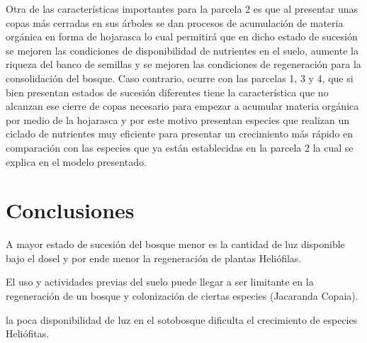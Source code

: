 \documentclass[letterpaper,9pt,onecolumn,twoside,]{pinp}
\begin{document}
Otra de las características importantes para la parcela 2 es que al
presentar unas copas más cerradas en sus árboles se dan procesos de
acumulación de materia orgánica en forma de hojarasca lo cual permitirá
que en dicho estado de sucesión se mejoren las condiciones de
disponibilidad de nutrientes en el suelo, aumente la riqueza del banco
de semillas y se mejoren las condiciones de regeneración para la
consolidación del bosque. Caso contrario, ocurre con las parcelas 1, 3 y
4, que si bien presentan estados de sucesión diferentes tiene la
característica que no alcanzan ese cierre de copas necesario para
empezar a acumular materia orgánica por medio de la hojarasca y por este
motivo presentan especies que realizan un ciclado de nutrientes muy
eficiente para presentar un crecimiento más rápido en comparación con
las especies que ya están establecidas en la parcela 2 la cual se
explica en el modelo presentado.

\hypertarget{conclusiones}{%
\section{Conclusiones}\label{conclusiones}}

A mayor estado de sucesión del bosque menor es la cantidad de luz
disponible bajo el dosel y por ende menor la regeneración de plantas
Heliófilas.

El uso y actividades previas del suelo puede llegar a ser limitante en
la regeneración de un bosque y colonización de ciertas especies
(Jacaranda Copaia).

la poca disponibilidad de luz en el sotobosque dificulta el crecimiento
de especies Heliófitas.





\end{document}
